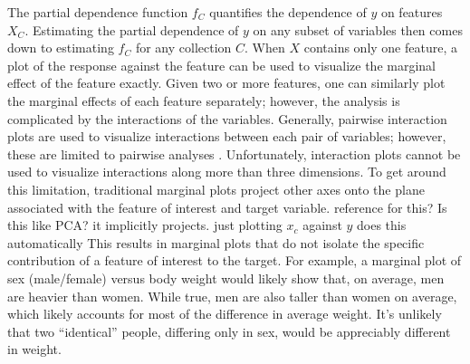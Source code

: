 \documentclass[12pt]{article}
\begin{document}
The partial dependence function $f_C$ quantifies the dependence of $y$ on features ${X}_C$. Estimating the partial dependence of $y$ on any subset of variables then comes down to estimating $f_C$ for any collection $C$. When $X$ contains only one feature, a plot of the response against the feature can be used to visualize the marginal effect of the feature exactly. Given two or more features, one can similarly plot the marginal effects of each feature separately; however, the analysis is complicated by the interactions of the variables. Generally, pairwise interaction plots are used to visualize interactions between each pair of variables; however, these are limited to pairwise analyses \citep{cox2014multivariate}. Unfortunately, interaction plots cannot be used to visualize interactions along more than three dimensions. To get around this limitation, traditional marginal plots project other axes onto the plane associated with the feature of interest and target variable. {\color{red} reference for this? Is this like PCA? it implicitly projects. just plotting $x_c$ against $y$ does this automatically} This results in marginal plots that do not isolate the specific contribution of a feature of interest to the target. For example, a marginal plot of sex (male/female) versus body weight would likely show that, on average, men are heavier than women. While true, men are also taller than women on average, which likely accounts for most of the difference in average weight. It's unlikely that two ``identical'' people, differing only in sex, would be appreciably different in weight. 
\end{document}
